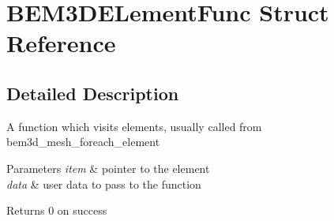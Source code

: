 \section{B\+E\+M3\+D\+E\+Lement\+Func Struct Reference}
\label{structBEM3DELementFunc}


\subsection{Detailed Description}
A function which visits elements, usually called from bem3d\+\_\+mesh\+\_\+foreach\+\_\+element


\begin{DoxyParams}{Parameters}
{\em item} & pointer to the element \\
\hline
{\em data} & user data to pass to the function\\
\hline
\end{DoxyParams}
\begin{DoxyReturn}{Returns}
0 on success 
\end{DoxyReturn}
